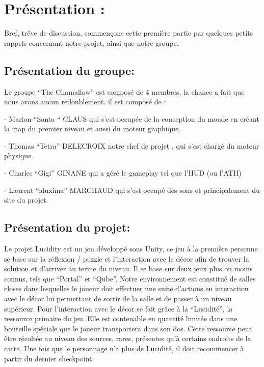 \documentclass[a4paper]{article}
\begin{document}
\quad

\newpage

\section{Présentation :}

\quad

Bref, trêve de discussion, commençons cette première partie par quelques petits rappels concernant notre projet, ainsi que notre groupe.

\quad

	\subsection{Présentation du groupe:}

\quad

Le groupe “The Chamallow”  est composé de 4 membres, la chance a fait que nous avons aucun redoublement. il est composé de  :

 - Marion “Santa “ CLAUS  qui s’est occupée de la conception du monde en créant la map du premier niveau et aussi du moteur graphique.

 - Thomas “Tetra” DELECROIX notre chef de projet , qui s’est chargé du moteur physique.

 - Charles “Gigi” GINANE qui a géré le gameplay tel que l’HUD (ou l’ATH)  

 - Laurent “aluxima” MARCHAUD qui s’est occupé des sons et principalement du site du projet.


\quad

	\subsection{Présentation du projet:}
\quad

    Le projet Lucidity est un jeu développé sous Unity, ce jeu à la première personne se base sur la réflexion / puzzle et l’interaction avec le décor afin de trouver la solution et d’arriver au terme du niveau. Il se base sur deux jeux plus ou moins connus, tels que “Portal” et “Qube”.
Notre environnement est constitué de salles closes dans lesquelles le joueur doit effectuer une suite d’actions en interaction avec le décor lui permettant de sortir de la salle et de passer à un niveau supérieur. Pour l'interaction avec le décor se fait grâce à la “Lucidité”, la ressource primaire du jeu. Elle est contenable en quantité limitée dans une bouteille spéciale que le joueur transportera dans son dos. Cette ressource peut être récoltée au niveau des sources, rares, présentes qu’à certains endroits de la carte. Une fois que le personnage n’a plus de Lucidité, il doit recommencer à partir du dernier checkpoint.
\end{document}
